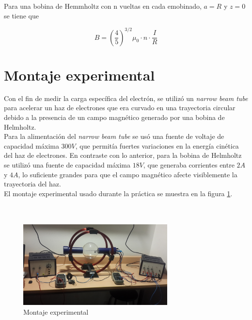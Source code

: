 \documentclass[prb,aps,twocolumn,preprintnumbers,amsmath,amssymb]{revtex4}
\begin{document}
Para una bobina de Hemmholtz con n vueltas en cada emobinado, $a = R$ y $z = 0$ se tiene que 

\begin{equation}
\label{campo helm.}
B = \left(\frac{4}{5}\right)^{3/2} \mu_{0}\cdot n\cdot \frac{I}{R}
\end{equation}

\section{Montaje experimental}

Con el fin de medir la carga específica del electrón, se utilizó un \textit{narrow beam tube} para acelerar un haz de electrones que era curvado en una trayectoria circular debido a la presencia de un campo magnético generado por una bobina de Helmholtz.\\

Para la alimentación del \textit{narrow beam tube} se usó una fuente de voltaje de capacidad máxima $300V$, que permitía fuertes variaciones en la energía cinética del haz de electrones. En contraste con lo anterior, para la bobina de Helmholtz se utilizó una fuente de capacidad máxima $18V$, que generaba corrientes entre $2A$ y $4A$, lo suficiente grandes para que el campo magnético afecte visiblemente la trayectoria del haz.\\

El montaje experimental usado durante la práctica se muestra en la figura \ref{fig:montaje}.\\\\\\

\begin{widetext}
	
	\begin{figure}[h!]
		\centering
		\includegraphics[width=0.7\textwidth]{carga-masa}
		\caption{Montaje experimental}
		\label{fig:montaje}
	\end{figure}
	
\end{widetext}
\end{document}
